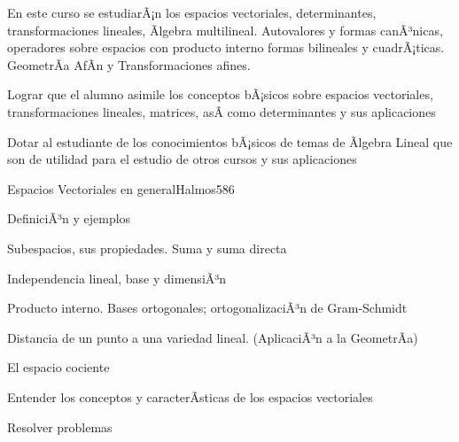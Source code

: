 \begin{syllabus}


\begin{justification}
En este curso se estudiarÃ¡n los espacios vectoriales, determinantes, transformaciones lineales, Ãlgebra multilineal.
Autovalores y formas canÃ³nicas, operadores sobre espacios con producto interno formas bilineales y cuadrÃ¡ticas. GeometrÃ­a AfÃ­n y Transformaciones afines.
\end{justification}

\begin{goals}
\item  Lograr que el alumno asimile los conceptos bÃ¡sicos sobre espacios vectoriales, transformaciones lineales, matrices, asÃ­ como determinantes y sus aplicaciones
\item  Dotar al estudiante de los conocimientos bÃ¡sicos de temas de Ãlgebra Lineal que son de utilidad para el estudio de otros cursos y sus aplicaciones
\end{goals}

\begin{outcomes}
\end{outcomes}

\begin{unit}{Espacios Vectoriales en general}{Halmos58}{6}
   \begin{topics}
         \item  DefiniciÃ³n y ejemplos
	 \item  Subespacios, sus propiedades. Suma y suma directa
         \item  Independencia lineal, base y dimensiÃ³n
	 \item  Producto interno. Bases ortogonales; ortogonalizaciÃ³n de Gram-Schmidt
         \item  Distancia de un punto a una variedad lineal. (AplicaciÃ³n a la GeometrÃ­a)
         \item  El espacio cociente
   \end{topics}

   \begin{unitgoals}
         \item  Entender los conceptos y caracterÃ­sticas de los espacios vectoriales
         \item  Resolver problemas
   \end{unitgoals}
\end{unit}


\end{syllabus}
